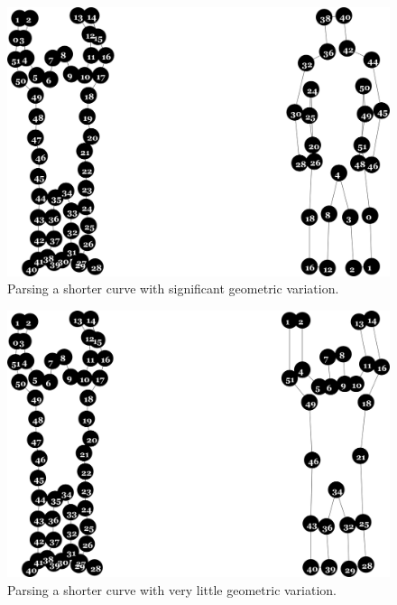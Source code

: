 \begin{figure}
\includegraphics[width=\linewidth]{output/1.models/shorter_curves/parse_0.png}
\caption{Parsing a shorter curve with significant geometric
  variation. }
\label{fig-shorter-2}
\end{figure}

\begin{figure}
\includegraphics[width=\linewidth]{output/1.models/shorter_curves/parse_8_2.png}
\caption{Parsing a shorter curve with very little geometric
  variation.}
\label{fig-shorter-3}
\end{figure}

